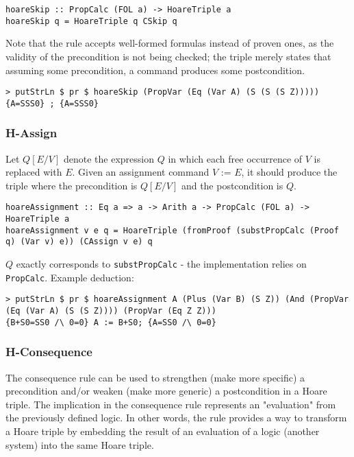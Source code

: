 \documentclass{article}
\begin{document}
\begin{lstlisting}
hoareSkip :: PropCalc (FOL a) -> HoareTriple a
hoareSkip q = HoareTriple q CSkip q
\end{lstlisting}

Note that the rule accepts well-formed formulas instead of proven ones, as the validity of the precondition is not being checked; the triple merely states that assuming some precondition, a command produces some postcondition.

\begin{lstlisting}
> putStrLn $ pr $ hoareSkip (PropVar (Eq (Var A) (S (S (S Z)))))
{A=SSS0} ; {A=SSS0}
\end{lstlisting}

\subsubsection{H-Assign}

Let $Q[E/V]$ denote the expression $Q$ in which each free occurrence of $V$ is replaced with $E$. Given an assignment command $V \texttt{ := } E$, it should produce the triple where the precondition is $Q[E/V]$ and the postcondition is $Q$.

\begin{lstlisting}
hoareAssignment :: Eq a => a -> Arith a -> PropCalc (FOL a) -> HoareTriple a
hoareAssignment v e q = HoareTriple (fromProof (substPropCalc (Proof q) (Var v) e)) (CAssign v e) q
\end{lstlisting}

$Q$ exactly corresponds to \texttt{substPropCalc} - the implementation relies on \texttt{PropCalc}. Example deduction:

\begin{lstlisting}
> putStrLn $ pr $ hoareAssignment A (Plus (Var B) (S Z)) (And (PropVar (Eq (Var A) (S (S Z)))) (PropVar (Eq Z Z)))
{B+S0=SS0 /\ 0=0} A := B+S0; {A=SS0 /\ 0=0}
\end{lstlisting}

\subsubsection{H-Consequence}

The consequence rule can be used to strengthen (make more specific) a precondition and/or weaken (make more generic) a postcondition in a Hoare triple. The implication in the consequence rule represents an "evaluation" from the previously defined logic. In other words, the rule provides a way to transform a Hoare triple by embedding the result of an evaluation of a logic (another system) into the same Hoare triple.
\end{document}
